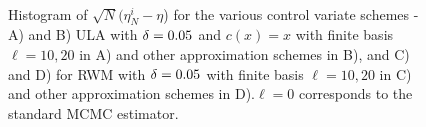 \begin{figure}[htbp]
	\centering
	\mbox{
  }
 \mbox{
 } 
	\caption{Histogram of $\sqrt{N}(\eta_N^{i} - \eta$) for the various control variate schemes -  A) and B) ULA with $\delta =0.05$ and $c(x) = x$ with finite basis $\ell = 10,20$ in A) and other approximation schemes in B), and C) and D) for RWM with $\delta = 0.05$ with finite basis $\ell = 10,20$ in C) and other approximation schemes in D).$\ell =0$ corresponds to the standard MCMC estimator.}
	\label{fig:mcmc_ula_rwm_hist}
\end{figure}

